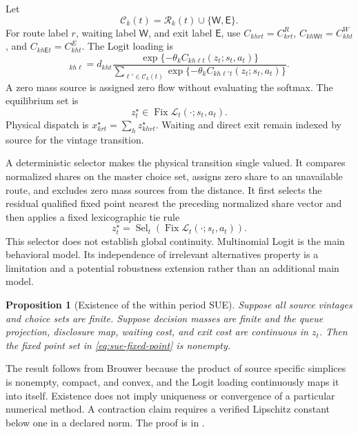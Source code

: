 \documentclass[a4paper,fleqn]{cas-sc}
\newtheorem{proposition}{Proposition}
\begin{document}
Let
\begin{equation}
 \mathcal C_k(t)=
 \mathcal R_k(t)\cup\{\mathsf W,\mathsf E\}.
 \label{eq:choice-set}
\end{equation}
For route label $r$, waiting label $\mathsf W$, and exit label $\mathsf E$, use
$C_{khr t}=C^R_{krt}$,
$C_{kh\mathsf Wt}=C^W_{kht}$, and
$C_{kh\mathsf Et}=C^E_{kht}$. The Logit loading is
\begin{equation}
 [\mathcal L_t(z_t;s_t,a_t)]_{kh\ell}=
 d_{kht}
 \frac{\exp\{-\theta_k C_{kh\ell t}(z_t;s_t,a_t)\}}
 {\sum_{\ell'\in\mathcal C_k(t)}
 \exp\{-\theta_k C_{kh\ell't}(z_t;s_t,a_t)\}}.
 \label{eq:logit-loading}
\end{equation}
A zero mass source is assigned zero flow without evaluating the softmax. The
equilibrium set is
\begin{equation}
 z_t^\star\in
 \operatorname{Fix}\mathcal L_t(\cdot;s_t,a_t).
 \label{eq:sue-fixed-point}
\end{equation}
Physical dispatch is
$x^\star_{krt}=\sum_hz^\star_{khrt}$. Waiting and direct exit remain indexed by
source for the vintage transition.

A deterministic selector makes the physical transition single valued. It
compares normalized shares on the master choice set, assigns zero share to an
unavailable route, and excludes zero mass sources from the distance. It first
selects the residual qualified fixed point nearest the preceding normalized
share vector and then applies a fixed lexicographic tie rule
\begin{equation}
 z_t^\star=
 \operatorname{Sel}_t\!\left(
 \operatorname{Fix}\mathcal L_t(\cdot;s_t,a_t)
 \right).
 \label{eq:equilibrium-selector}
\end{equation}
This selector does not establish global continuity. Multinomial Logit is the
main behavioral model. Its independence of irrelevant alternatives property
is a limitation and a potential robustness extension rather than an additional
main model.

\begin{proposition}[Existence of the within period SUE]
\label{prop:sue-existence}
Suppose all source vintages and choice sets are finite. Suppose decision masses
are finite and the queue projection, disclosure map, waiting cost, and exit
cost are continuous in $z_t$. Then the fixed point set in
\cref{eq:sue-fixed-point} is nonempty.
\end{proposition}
The result follows from Brouwer because the product of source specific
simplices is nonempty, compact, and convex, and the Logit loading continuously
maps it into itself. Existence does not imply uniqueness or convergence of a
particular numerical method. A contraction claim requires a verified
Lipschitz constant below one in a declared norm. The proof is in
.
\end{document}
